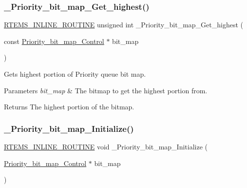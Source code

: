 \subsubsection{\texorpdfstring{\_Priority\_bit\_map\_Get\_highest()}{\_Priority\_bit\_map\_Get\_highest()}}
{\footnotesize\ttfamily \mbox{\hyperlink{group__RTEMSScoreBaseDefs_gac216239df231d5dbd15e3520b0b9313f}{R\+T\+E\+M\+S\+\_\+\+I\+N\+L\+I\+N\+E\+\_\+\+R\+O\+U\+T\+I\+NE}} unsigned int \+\_\+\+Priority\+\_\+bit\+\_\+map\+\_\+\+Get\+\_\+highest (\begin{DoxyParamCaption}\item[{const \mbox{\hyperlink{structPriority__bit__map__Control}{Priority\+\_\+bit\+\_\+map\+\_\+\+Control}} $\ast$}]{bit\+\_\+map }\end{DoxyParamCaption})}



Gets highest portion of Priority queue bit map. 


\begin{DoxyParams}{Parameters}
{\em bit\+\_\+map} & The bitmap to get the highest portion from.\\
\hline
\end{DoxyParams}
\begin{DoxyReturn}{Returns}
The highest portion of the bitmap. 
\end{DoxyReturn}
\mbox{\label{group__RTEMSScorePriority_gae1b3ddc145139b8cedba8169214f2dab}} 
\subsubsection{\texorpdfstring{\_Priority\_bit\_map\_Initialize()}{\_Priority\_bit\_map\_Initialize()}}
{\footnotesize\ttfamily \mbox{\hyperlink{group__RTEMSScoreBaseDefs_gac216239df231d5dbd15e3520b0b9313f}{R\+T\+E\+M\+S\+\_\+\+I\+N\+L\+I\+N\+E\+\_\+\+R\+O\+U\+T\+I\+NE}} void \+\_\+\+Priority\+\_\+bit\+\_\+map\+\_\+\+Initialize (\begin{DoxyParamCaption}\item[{\mbox{\hyperlink{structPriority__bit__map__Control}{Priority\+\_\+bit\+\_\+map\+\_\+\+Control}} $\ast$}]{bit\+\_\+map }\end{DoxyParamCaption})}



